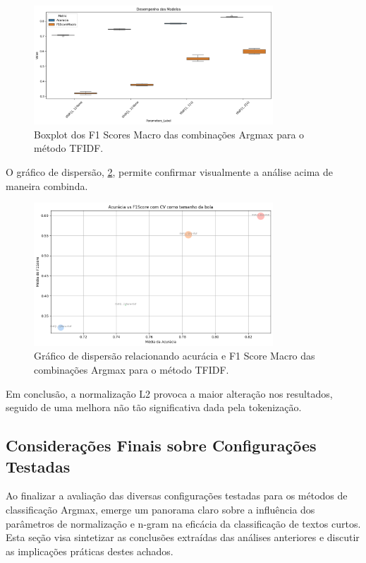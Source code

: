 \begin{figure}[H]
    \centering
    \includegraphics[width=0.8\textwidth]{images/boxtfidf.png}
    \caption{Boxplot dos F1 Scores Macro das combinações Argmax para o método TFIDF.}
    \label{fig:boxplot_tfidf}
\end{figure}

O gráfico de dispersão, \ref{fig:scatter_tfidf}, permite confirmar visualmente a análise acima de maneira combinda.  

\begin{figure}[H]
    \centering
    \includegraphics[width=0.8\textwidth]{images/dispersaotfidf.png}
    \caption{Gráfico de dispersão relacionando acurácia e F1 Score Macro das combinações Argmax para o método TFIDF.}
    \label{fig:scatter_tfidf}
\end{figure}

Em conclusão, a normalização L2 provoca a maior alteração nos resultados, seguido de uma melhora não tão significativa dada pela tokenização.


\subsection{Considerações Finais sobre Configurações Testadas}

Ao finalizar a avaliação das diversas configurações testadas para os métodos de classificação Argmax, emerge um panorama claro sobre a influência dos parâmetros de normalização e n-gram na eficácia da classificação de textos curtos. Esta seção visa sintetizar as conclusões extraídas das análises anteriores e discutir as implicações práticas destes achados.

